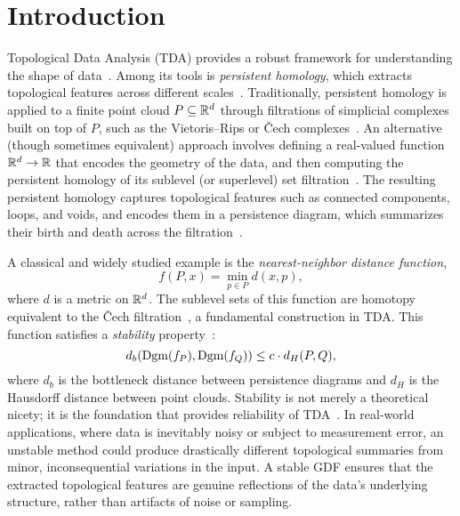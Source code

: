 \newcommand{\package}{\emph}

\chapter{Introduction}
\label{chap:introduction}

Topological Data Analysis (TDA) provides a robust framework for understanding
the shape of data~\cite{carlsson2021topological}. Among its tools is
\emph{persistent homology}, which extracts
topological features across different scales~\cite{boissonnat2018geometric}.
Traditionally, persistent homology is applied to a finite point cloud $P
\subseteq \mathbb{R}^d$ through filtrations of simplicial complexes built on top of $P$,
such as the Vietoris–Rips or \v{C}ech complexes~\cite{chazal2021introduction}.
An alternative (though sometimes equivalent) approach involves defining a
real-valued function $\mathbb{R}^d \to \mathbb{R}$ that encodes the geometry of the data, and
then computing the persistent homology of its sublevel (or superlevel) set
filtration~\cite{edelsbrunner2010computational}. The resulting persistent
homology captures topological features such as connected components, loops, and
voids, and encodes them in a persistence diagram, which summarizes their birth
and death across the filtration~\cite{chazal2021introduction}.

A classical and widely studied example is the \emph{nearest-neighbor distance
function},
\begin{equation}
    f(P, x) = \min_{p \in P} d(x, p),
\end{equation}
where $d$ is a metric on $\mathbb{R}^d$. The sublevel sets of this function are
homotopy equivalent to the \v{C}ech filtration~\cite{schnider2024introduction},
a fundamental construction in TDA.  This function satisfies a \emph{stability}
property~\cite{chazal2013persistencestabilitygeometriccomplexes}:
\begin{equation}
    d_b(\operatorname{Dgm}(f_P), \operatorname{Dgm}(f_Q)) \leq c \cdot d_H(P, Q),
\end{equation}
where $d_b$ is the bottleneck distance between persistence diagrams and $d_H$ is
the Hausdorff distance between point clouds. Stability is not merely a
theoretical nicety; it is the foundation that provides reliability of
TDA~\cite{chazal2021introduction}. In real-world applications, where data is
inevitably noisy or subject to measurement error, an unstable method could
produce drastically different topological summaries from minor, inconsequential
variations in the input. A stable GDF ensures that the extracted topological
features are genuine reflections of the data's underlying structure, rather than
artifacts of noise or sampling.

